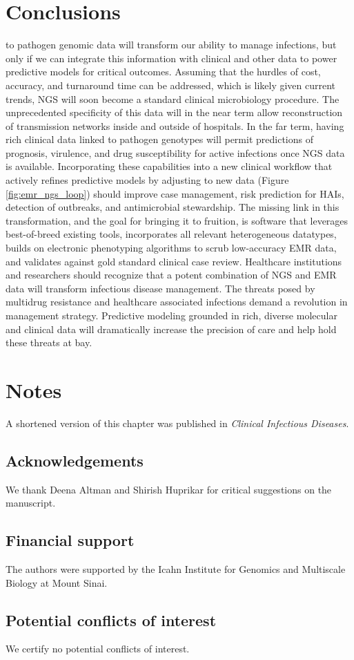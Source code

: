 \section{Conclusions}

 to pathogen genomic data will transform our ability to manage infections, but only if we can integrate this information with clinical and other data to power predictive models for critical outcomes. Assuming that the hurdles of cost, accuracy, and turnaround time can be addressed, which is likely given current trends, NGS will soon become a standard clinical microbiology procedure. The unprecedented specificity of this data will in the near term allow reconstruction of transmission networks inside and outside of hospitals. In the far term, having rich clinical data linked to pathogen genotypes will permit predictions of prognosis, virulence, and drug susceptibility for active infections once NGS data is available. Incorporating these capabilities into a new clinical workflow that actively refines predictive models by adjusting to new data (Figure \ref{fig:emr_ngs_loop}) should improve case management, risk prediction for HAIs, detection of outbreaks, and antimicrobial stewardship. The missing link in this transformation, and the goal for bringing it to fruition, is software that leverages best-of-breed existing tools, incorporates all relevant heterogeneous datatypes, builds on electronic phenotyping algorithms to scrub low-accuracy EMR data, and validates against gold standard clinical case review.
Healthcare institutions and researchers should recognize that a potent combination of NGS and EMR data will transform infectious disease management. The threats posed by multidrug resistance and healthcare associated infections demand a revolution in management strategy. Predictive modeling grounded in rich, diverse molecular and clinical data will dramatically increase the precision of care and help hold these threats at bay.

\section*{Notes}

A shortened version of this chapter was published in \textit{Clinical Infectious Diseases}.\autocite{Pak2015}

\subsection{Acknowledgements}

We thank Deena Altman and Shirish Huprikar for critical suggestions on the manuscript.

\subsection{Financial support}

The authors were supported by the Icahn Institute for Genomics and Multiscale Biology at Mount Sinai.

\subsection{Potential conflicts of interest}
We certify no potential conflicts of interest.
